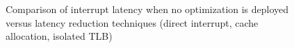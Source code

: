 \begin{figure}[!htb]
\begin{center}
\begin{tikzpicture}[
						my brace/.style={thick, decorate, decoration={brace, amplitude=4pt, raise=10pt,},},							
						my label/.style={below right, align=center, rotate=90, inner ysep=14pt, },
					]


\end{tikzpicture}
\end{center}
\ifreport
\caption{Comparison of interrupt latency when no optimization is deployed versus latency reduction techniques (direct interrupt, cache allocation, isolated TLB)}
\label{plot-allopt}
\else
\label{plot-allopt2}
\fi
\end{figure}

